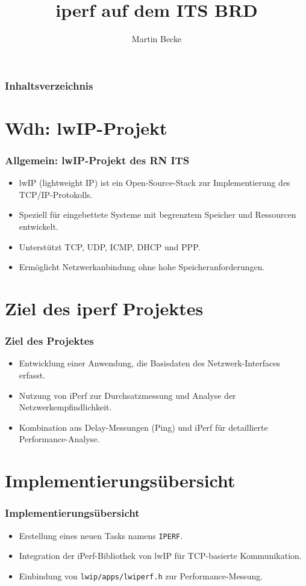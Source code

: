 \documentclass{beamer}
\title{iperf auf dem ITS BRD}
\author{Martin Becke}
\date{}
\begin{document}
\frame{\titlepage}

\begin{frame}
    \frametitle{Inhaltsverzeichnis}
    \tableofcontents
\end{frame}

\section{Wdh: lwIP-Projekt}
\begin{frame}
    \frametitle{Allgemein: lwIP-Projekt des RN ITS}
    \begin{itemize}
        \item lwIP (lightweight IP) ist ein Open-Source-Stack zur Implementierung des TCP/IP-Protokolls.
        \item Speziell für eingebettete Systeme mit begrenztem Speicher und Ressourcen entwickelt.
        \item Unterstützt TCP, UDP, ICMP, DHCP und PPP.
        \item Ermöglicht Netzwerkanbindung ohne hohe Speicheranforderungen.
    \end{itemize}
\end{frame}


\section{Ziel des iperf Projektes}
\begin{frame}
    \frametitle{Ziel des Projektes}
    \begin{itemize}
        \item Entwicklung einer Anwendung, die Basisdaten des Netzwerk-Interfaces erfasst.
        \item Nutzung von iPerf zur Durchsatzmessung und Analyse der Netzwerkempfindlichkeit.
        \item Kombination aus Delay-Messungen (Ping) und iPerf für detaillierte Performance-Analyse.
    \end{itemize}
\end{frame}

\section{Implementierungsübersicht}
\begin{frame}
    \frametitle{Implementierungsübersicht}
    \begin{itemize}
        \item Erstellung eines neuen Tasks namens \texttt{IPERF}.
        \item Integration der iPerf-Bibliothek von lwIP für TCP-basierte Kommunikation.
        \item Einbindung von \texttt{lwip/apps/lwiperf.h} zur Performance-Messung.
    \end{itemize}
\end{frame}
\end{document}
